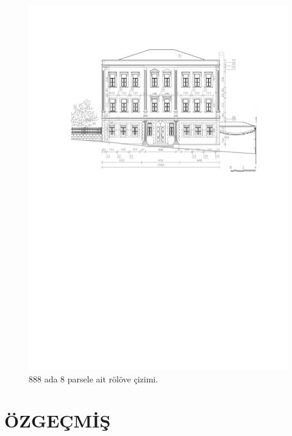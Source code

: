\begin{figure}
\centering
\includegraphics[width=1\textwidth,height=\textheight]{source/figures/Roloveler/R888-8.pdf}
\caption{888 ada 8 parsele ait rölöve çizimi.}
\end{figure}

\newpage

\chapter*{ÖZGEÇMİŞ}
{}
\thispagestyle{empty}

